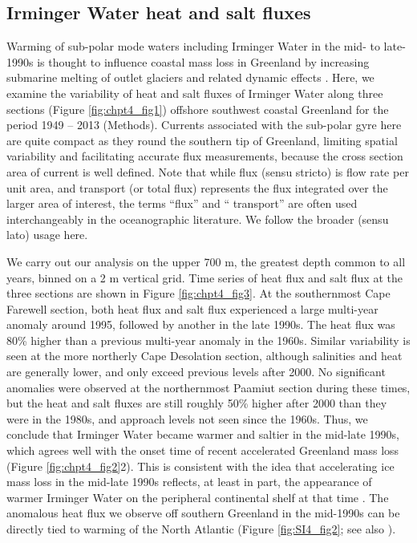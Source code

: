 \subsection{Irminger Water heat and salt fluxes}
Warming of sub-polar mode waters including Irminger Water in the mid- to late-1990s \cite[]{myers2007b,thierry2008}is thought to influence coastal mass loss in Greenland by increasing submarine melting of outlet glaciers and related dynamic effects \cite[]{holland2008,joughin2012,straneo2013}.  Here, we examine the variability of heat and salt fluxes of Irminger Water along three sections (Figure \ref{fig:chpt4_fig1}) offshore southwest coastal Greenland for the period 1949 – 2013 (Methods).  Currents associated with the sub-polar gyre here are quite compact as they round the southern tip of Greenland, limiting spatial variability and facilitating accurate flux measurements, because the cross section area of current is well defined.  Note that while flux (sensu stricto) is flow rate per unit area, and transport (or total flux) represents the flux integrated over the larger area of interest, the terms “flux” and “ transport” are often used interchangeably in the oceanographic literature.  We follow the broader (sensu lato) usage here.  

We carry out our analysis on the upper 700 m, the greatest depth common to all years, binned on a 2 m vertical grid.   Time series of heat flux and salt flux at the three sections are shown in Figure \ref{fig:chpt4_fig3}.  At the southernmost Cape Farewell section, both heat flux and salt flux experienced a large multi-year anomaly around 1995, followed by another in the late 1990s.  The heat flux was 80\% higher than a previous multi-year anomaly in the 1960s.  Similar variability is seen at the more northerly Cape Desolation section, although salinities and heat are generally lower, and only exceed previous levels after 2000.  No significant anomalies were observed at the northernmost Paamiut section during these times, but the heat and salt fluxes are still roughly 50\% higher after 2000 than they were in the 1980s, and approach levels not seen since the 1960s. Thus, we conclude that Irminger Water became warmer and saltier in the mid-late 1990s, which agrees well with the onset time of recent accelerated Greenland mass loss (Figure \ref{fig:chpt4_fig2}2).  This is consistent with the idea that accelerating ice mass loss in the mid-late 1990s reflects, at least in part, the appearance of warmer Irminger Water on the peripheral continental shelf at that time \cite[]{holland2008}.  The anomalous heat flux we observe off southern Greenland in the mid-1990s can be directly tied to warming of the North Atlantic (Figure \ref{fig:SI4_fig2}; see also \citet{straneo2013}). 

